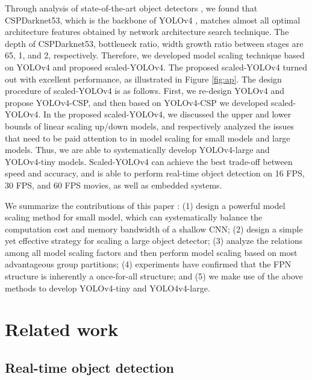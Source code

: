 \documentclass[10pt,twocolumn,letterpaper]{article}
\begin{document}
Through analysis of state-of-the-art object detectors \cite{bochkovskiy2020yolov4, cao2020d2det, du2019spinenet, qiu2020borderdet, tan2019efficientdet, wang2020scale, zhang2020dynamic}, we found that CSPDarknet53, which is the backbone of YOLOv4 \cite{bochkovskiy2020yolov4}, matches almost all optimal architecture features obtained by network architecture search technique.  The depth of CSPDarknet53, bottleneck ratio, width growth ratio between stages are 65, 1, and 2, respectively.  Therefore, we developed model scaling technique based on YOLOv4 and proposed scaled-YOLOv4.  The proposed scaled-YOLOv4 turned out with excellent performance, as illustrated in Figure \ref{fig:ap}.  The design procedure of scaled-YOLOv4 is as follows.  First, we re-design YOLOv4 and propose YOLOv4-CSP, and then based on YOLOv4-CSP we developed scaled-YOLOv4.  In the proposed scaled-YOLOv4, we discussed the upper and lower bounds of linear scaling up/down models, and respectively analyzed the issues that need to be paid attention to in model scaling for small models and large models.  Thus, we are able to systematically develop YOLOv4-large and YOLOv4-tiny models.  Scaled-YOLOv4 can achieve the best trade-off between speed and accuracy, and is able to perform real-time object detection on 16 FPS, 30 FPS, and 60 FPS movies, as well as embedded systems.

We summarize the contributions of this paper : (1) design a powerful model scaling method for small model, which can systematically balance the computation cost and memory bandwidth of a shallow CNN; (2) design a simple yet effective strategy for scaling a large object detector; (3) analyze the relations among all model scaling factors and then perform model scaling based on most advantageous group partitions; (4) experiments have confirmed that the FPN structure is inherently a once-for-all structure; and (5) we make use of the above methods to develop YOLOv4-tiny and YOLO4v4-large.

\section{Related work}

\subsection{Real-time object detection}
\end{document}
